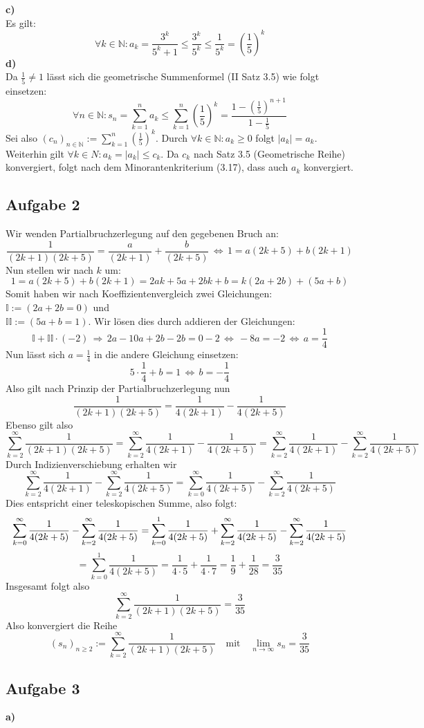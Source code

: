 \documentclass[a4paper,graphics,11pt]{article}
\newcommand{\aufgabe}[1]{\subsection*{Aufgabe #1}}
\begin{document}
\textbf{c)}\\[5pt]
Es gilt:
$$
    \forall k \in \mathbb{N} \colon a_k = \frac{3^k}{5^k+1} \leq \frac{3^k}{5^k} \leq \frac{1}{5^k}
    = \left(\frac{1}{5}\right)^k
$$
\newpage
\textbf{d)}\\[5pt]
Da $\frac{1}{5}\neq1$ lässt sich die geometrische Summenformel (II Satz 3.5)
wie folgt einsetzen:
$$
    \forall n \in \mathbb{N} \colon s_n = \sum_{k=1}^{n} a_k
    \leq \sum_{k=1}^{n} \left(\frac{1}{5}\right)^k
    = \frac{1-\left(\frac{1}{5}\right)^{n+1}}{1-\frac{1}{5}}
$$
Sei also $(c_n)_{n \in \mathbb{N}} := \sum_{k=1}^{n} \left(\frac{1}{5}\right)^k$.
Durch $\forall k \in \mathbb{N} \colon a_k \geq 0$ folgt $|a_k| = a_k$.\\
Weiterhin gilt $\forall k \in N\colon a_k = |a_k| \leq c_k$. Da $c_k$ nach
Satz 3.5 (Geometrische Reihe) konvergiert, folgt nach dem Minorantenkriterium (3.17), dass
auch $a_k$ konvergiert.
\newpage
\aufgabe{2}
Wir wenden Partialbruchzerlegung auf den gegebenen Bruch an:
$$
    \frac{1}{(2k+1)(2k+5)} = \frac{a}{(2k+1)} + \frac{b}{(2k+5)} \,\Longleftrightarrow\,
    1 = a(2k+5) + b(2k+1)
$$
Nun stellen wir nach $k$ um:
$$
    1 = a(2k+5) + b(2k+1) = 2ak+5a+2bk+b = k(2a+2b) + (5a+b)
$$
Somit haben wir nach Koeffizientenvergleich zwei Gleichungen: $ \mathbb{I}:=(2a+2b = 0)$
und \\$\mathbb{II}:=(5a+b = 1)$. Wir lösen dies durch addieren der Gleichungen:
$$
    \mathbb{I} + \mathbb{II}\cdot(-2) \,\Longrightarrow\, 2a-10a+2b-2b=0-2
    \,\Longleftrightarrow\, -8a = -2
    \,\Longleftrightarrow\, a = \frac{1}{4}
$$
Nun lässt sich $a = \frac{1}{4}$ in die andere Gleichung einsetzen:
$$
    5\cdot \frac{1}{4}+b = 1 \,\Longleftrightarrow\, b = -\frac{1}{4}
$$
Also gilt nach Prinzip der Partialbruchzerlegung nun
$$
    \frac{1}{(2k+1)(2k+5)} = \frac{1}{4(2k+1)} - \frac{1}{4(2k+5)}
$$
Ebenso gilt also
$$
    \sum_{k=2}^{\infty} \frac{1}{(2k+1)(2k+5)}
    = \sum_{k=2}^{\infty} \frac{1}{4(2k+1)} - \frac{1}{4(2k+5)}
    = \sum_{k=2}^{\infty} \frac{1}{4(2k+1)} - \sum_{k=2}^{\infty} \frac{1}{4(2k+5)}
$$
Durch Indizienverschiebung erhalten wir
$$
    \sum_{k=2}^{\infty} \frac{1}{4(2k+1)} - \sum_{k=2}^{\infty} \frac{1}{4(2k+5)}
    = \sum_{k=0}^{\infty} \frac{1}{4(2k+5)} - \sum_{k=2}^{\infty} \frac{1}{4(2k+5)}
$$
Dies entspricht einer teleskopischen Summe, also folgt:
$$
    \sum_{k=0}^{\infty} \frac{1}{4(2k+5)} - \sum_{k=2}^{\infty} \frac{1}{4(2k+5)}
    = \sum_{k=0}^{1} \frac{1}{4(2k+5)} +
    \sum_{k=2}^{\infty} \frac{1}{4(2k+5)} - \sum_{k=2}^{\infty} \frac{1}{4(2k+5)}\\
$$$$
    = \sum_{k=0}^{1} \frac{1}{4(2k+5)} = \frac{1}{4\cdot 5} + \frac{1}{4\cdot 7} 
    = \frac{1}{9} + \frac{1}{28} = \frac{3}{35}
$$
Insgesamt folgt also
$$
    \sum_{k=2}^{\infty} \frac{1}{(2k+1)(2k+5)} = \frac{3}{35}
$$
Also konvergiert die Reihe
$$
    (s_n)_{n\geq 2} := \sum_{k=2}^{\infty} \frac{1}{(2k+1)(2k+5)}\quad\text{mit}\quad
    \lim_{n \to \infty} s_n = \frac{3}{35}
$$
\newpage
\aufgabe{3}
\textbf{a)}\\[5pt]
\end{document}
